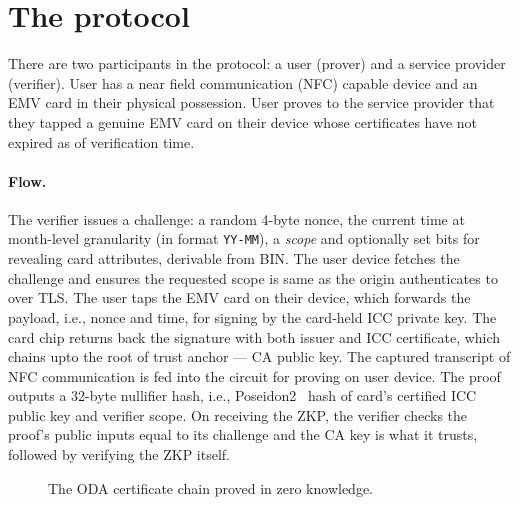 \documentclass[10pt,a4paper]{article}
\begin{document}
\section{The protocol}

There are two participants in the protocol: a user (prover) and a service provider (verifier).
User has a near field communication (NFC) capable device and an EMV card in their physical possession.
User proves to the service provider that they tapped a genuine EMV card on their device whose certificates have not expired as of verification time.

\paragraph{Flow.}
The verifier issues a challenge: a random 4-byte nonce, the current time at month-level granularity (in format \texttt{YY-MM}), a \emph{scope} and optionally set bits for revealing card attributes, derivable from BIN.
The user device fetches the challenge and ensures the requested scope is same as the origin authenticates to over TLS.
The user taps the EMV card on their device, which forwards the payload, i.e., nonce and time, for signing by the card-held ICC private key.
The card chip returns back the signature with both issuer and ICC certificate, which chains upto the root of trust anchor --- CA public key.
The captured transcript of NFC communication is fed into the circuit for proving on user device.
The proof outputs a 32-byte nullifier hash, i.e., Poseidon2~\cite{DBLP:conf/africacrypt/GrassiKS23} hash of card's certified ICC public key and verifier scope.
On receiving the ZKP, the verifier checks the proof's public inputs equal to its challenge and the CA key is what it trusts, followed by verifying the ZKP itself.

\begin{figure}[t]
\centering
{}
\caption{The ODA certificate chain proved in zero knowledge.}
\label{fig:chain}
\end{figure}
\end{document}
